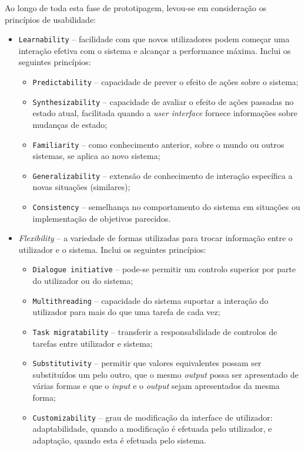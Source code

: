 Ao longo de toda esta fase de prototipagem, levou-se em consideração os princípios de usabilidade:
\begin{itemize}
    \item \texttt{Learnability} -- facilidade com que novos utilizadores podem começar uma interação efetiva com o sistema e alcançar a performance máxima. Inclui os seguintes princípios:
    \begin{itemize}
        \item \texttt{Predictability} -- capacidade de prever o efeito de ações sobre o sistema;
        \item \texttt{Synthesizability} -- capacidade de avaliar o efeito de ações passadas no estado atual, facilitada quando a \textit{user interface} fornece informações sobre mudanças de estado;
        \item \texttt{Familiarity} -- como conhecimento anterior, sobre o mundo ou outros sistemas, se aplica ao novo sistema;
        \item \texttt{Generalizability} -- extensão de conhecimento de interação específica a novas situações (similares);
        \item \texttt{Consistency} -- semelhança no comportamento do sistema em situações ou implementação de objetivos parecidos.
    \end{itemize}

    \item \textit{Flexibility} -- a variedade de formas utilizadas para trocar informação entre o utilizador e o sistema. Inclui os seguintes princípios:
    \begin{itemize}
        \item \texttt{Dialogue initiative} -- pode-se permitir um controlo superior por parte do utilizador ou do sistema;
        \item \texttt{Multithreading} -- capacidade do sistema suportar a interação do utilizador para mais do que uma tarefa de cada vez;
        \item \texttt{Task migratability} -- transferir a responsabilidade de controlos de tarefas entre utilizador e sistema;
        \item \texttt{Substitutivity} -- permitir que valores equivalentes possam ser substituídos um pelo outro, que o mesmo \textit{output} possa ser apresentado de várias formas e que o \textit{input} e o \textit{output} sejam apresentados da mesma forma;
        \item \texttt{Customizability} -- grau de modificação da interface de utilizador: adaptabilidade, quando a modificação é efetuada pelo utilizador, e adaptação, quando esta é efetuada pelo sistema.
    \end{itemize}


\end{itemize}
